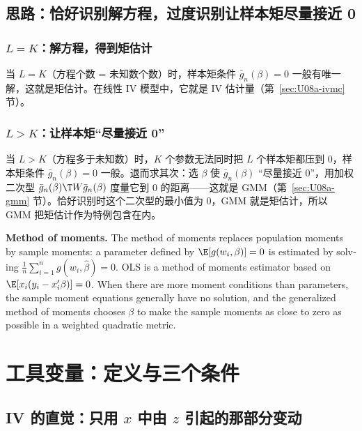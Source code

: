 \subsection{思路：恰好识别解方程，过度识别让样本矩尽量接近 0}

\subsubsection{\texorpdfstring{$L=K$}{L = K}：解方程，得到矩估计}

当 $L=K$（方程个数 = 未知数个数）时，样本矩条件 $\bar g_n(\beta)=0$ 一般有唯一解，这就是矩估计。在线性 IV 模型中，它就是 IV 估计量（第~\ref{sec:U08a-ivmc} 节）。

\subsubsection{\texorpdfstring{$L>K$}{L > K}：让样本矩“尽量接近 0”}

当 $L>K$（方程多于未知数）时，$K$ 个参数无法同时把 $L$ 个样本矩都压到 0，样本矩条件 $\bar g_n(\beta)=0$ 一般。退而求其次：选 $\beta$ 使 $\bar g_n(\beta)$ “尽量接近 0”，用加权二次型 $\bar g_n(\beta)\T W\bar g_n(\beta)$ 度量它到 0 的距离——这就是 GMM（第~\ref{sec:U08a-gmm} 节）。恰好识别时这个二次型的最小值为 0，GMM 就是矩估计，所以 GMM 把矩估计作为特例包含在内。

\begin{english}
\textbf{Method of moments.} The method of moments replaces population moments by sample moments: a parameter defined by $\E[g(w_i,\beta)]=0$ is estimated by solving $\frac1n\sum_{i=1}^n g(w_i,\hat\beta)=0$. OLS is a method of moments estimator based on $\E[x_i(y_i-x_i'\beta)]=0$. When there are more moment conditions than parameters, the sample moment equations generally have no solution, and the generalized method of moments chooses $\beta$ to make the sample moments as close to zero as possible in a weighted quadratic metric.
\end{english}

\section{工具变量：定义与三个条件}\label{sec:U08a-iv}

\subsection{IV 的直觉：只用 \texorpdfstring{$x$}{x} 中由 \texorpdfstring{$z$}{z} 引起的那部分变动}

